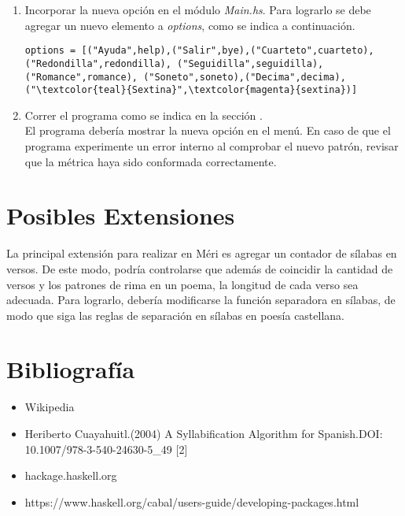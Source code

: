 \documentclass[12pt, a4paper]{article}
\begin{document}
\begin{enumerate}
	\item Incorporar la nueva opción en el módulo \textit{Main.hs}. Para lograrlo se debe agregar un nuevo elemento a \textit{options}, como se indica a continuación.

\begin{Verbatim}[commandchars=\\\{\}]
options = [("Ayuda",help),("Salir",bye),("Cuarteto",cuarteto),
("Redondilla",redondilla), ("Seguidilla",seguidilla), 
("Romance",romance), ("Soneto",soneto),("Decima",decima),
("\textcolor{teal}{Sextina}",\textcolor{magenta}{sextina})]
\end{Verbatim}	
	
	\item Correr el programa como se indica en la sección .\\
	El programa debería mostrar la nueva opción en el menú. En caso de que el programa experimente un error interno al comprobar el nuevo patrón, revisar que la métrica haya sido conformada correctamente.
\end{enumerate}


\section*{Posibles Extensiones} 
La principal extensión para realizar en Méri es agregar un contador de sílabas en versos. De este modo, podría controlarse que además de coincidir la cantidad de versos y los patrones de rima en un poema, la longitud de cada verso sea adecuada. Para lograrlo, debería modificarse la función separadora en sílabas, de modo que siga las reglas de separación en sílabas en poesía castellana.

\section*{Bibliografía}
 \begin{itemize}
 	\item Wikipedia
 	\item Heriberto Cuayahuitl.(2004) A Syllabification Algorithm for Spanish.DOI: 10.1007/978-3-540-24630-5\_49 [2]
 	\item hackage.haskell.org
 	\item https://www.haskell.org/cabal/users-guide/developing-packages.html
 \end{itemize}
\end{document}
